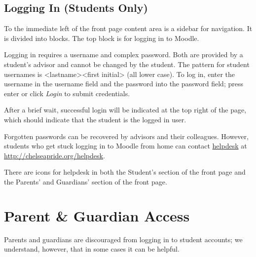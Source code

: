 \documentclass[letterpaper,10pt,english]{sphinxmanual}
\begin{document}
\subsection{Logging In (Students Only)}
\label{moodle:logging-in-students-only}
To the immediate left of the front page content area is a sidebar for navigation. It is divided into blocks. The top block is for logging in to Moodle.

Logging in requires a username and complex password. Both are provided by a student's advisor and cannot be changed by the student. The pattern for student usernames is \textless{}lastname\textgreater{}\textless{}first initial\textgreater{} (all lower case). To log in, enter the username in the username field and the password into the password field; press enter or click \emph{Login} to submit credentials.

{\hfill{}\hfill}

After a brief wait, successful login will be indicated at the top right of the page, which should indicate that the student is the logged in user.

Forgotten passwords can be recovered by advisors and their colleagues. However, students who get stuck logging in to Moodle from home can contact \href{http://chelseapride.org/helpdesk}{helpdesk} at \href{http://chelseapride.org/helpdesk}{http://chelseapride.org/helpdesk}.

There are icons for helpdesk in both the Student's section of the front page and the Parents' and Guardians' section of the front page.


\section{Parent \& Guardian Access}
\label{moodle:parent-guardian-access}
Parents and guardians are discouraged from logging in to student accounts; we understand, however, that in some cases it can be helpful.
\end{document}
